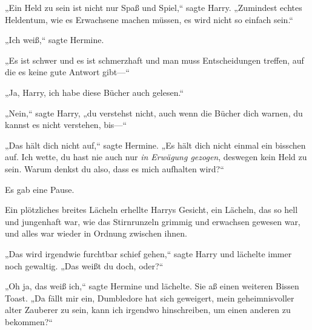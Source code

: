 „Ein Held zu sein ist nicht nur Spaß und Spiel,“ sagte Harry. „Zumindest echtes Heldentum, wie es Erwachsene machen müssen, es wird nicht so einfach sein.“

„Ich weiß,“ sagte Hermine.

„Es ist schwer und es ist schmerzhaft und man muss Entscheidungen treffen, auf die es keine gute Antwort gibt—“

„Ja, Harry, ich habe diese Bücher auch gelesen.“

„Nein,“ sagte Harry, „du verstehst nicht, auch wenn die Bücher dich warnen, du kannst es nicht verstehen, bis—“

„Das hält dich nicht auf,“ sagte Hermine. „Es hält dich nicht einmal ein bisschen auf. Ich wette, du hast nie auch nur \emph{in Erwägung gezogen}, deswegen kein Held zu sein. Warum denkst du also, dass es mich aufhalten wird?“

Es gab eine Pause.

Ein plötzliches breites Lächeln erhellte Harrys Gesicht, ein Lächeln, das so hell und jungenhaft war, wie das Stirnrunzeln grimmig und erwachsen gewesen war, und alles war wieder in Ordnung zwischen ihnen.

„Das wird irgendwie furchtbar schief gehen,“ sagte Harry und lächelte immer noch gewaltig. „Das weißt du doch, oder?“

„Oh ja, das weiß ich,“ sagte Hermine und lächelte. Sie aß einen weiteren Bissen Toast. „Da fällt mir ein, Dumbledore hat sich geweigert, mein geheimnisvoller alter Zauberer zu sein, kann ich irgendwo hinschreiben, um einen anderen zu bekommen?“

